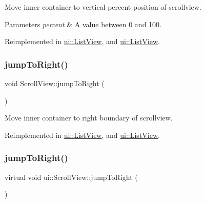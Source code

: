 Move inner container to vertical percent position of scrollview. 
\begin{DoxyParams}{Parameters}
{\em percent} & A value between 0 and 100. \\
\hline
\end{DoxyParams}


Reimplemented in \hyperlink{classui_1_1ListView_a0c76de2de006a8e9eea7225df545622e}{ui\+::\+List\+View}, and \hyperlink{classui_1_1ListView_a970383495e57eebfa9306c1876dbcff6}{ui\+::\+List\+View}.

\mbox{\label{classui_1_1ScrollView_ade536205c63207b9efdf6d2dac9631ae}} 
\subsubsection{\texorpdfstring{jump\+To\+Right()}{jumpToRight()}\hspace{0.1cm}{\footnotesize\ttfamily [1/2]}}
{\footnotesize\ttfamily void Scroll\+View\+::jump\+To\+Right (\begin{DoxyParamCaption}{ }\end{DoxyParamCaption})\hspace{0.3cm}{\ttfamily [virtual]}}

Move inner container to right boundary of scrollview. 

Reimplemented in \hyperlink{classui_1_1ListView_aca7e4b44da940fdab188d7b713ada04a}{ui\+::\+List\+View}, and \hyperlink{classui_1_1ListView_a07a1265c424478b68dc7d691bd29dc85}{ui\+::\+List\+View}.

\mbox{\label{classui_1_1ScrollView_a4d2fe47c1e20b30c08d624afe9d8cd2c}} 
\subsubsection{\texorpdfstring{jump\+To\+Right()}{jumpToRight()}\hspace{0.1cm}{\footnotesize\ttfamily [2/2]}}
{\footnotesize\ttfamily virtual void ui\+::\+Scroll\+View\+::jump\+To\+Right (\begin{DoxyParamCaption}{ }\end{DoxyParamCaption})\hspace{0.3cm}{\ttfamily [virtual]}}

